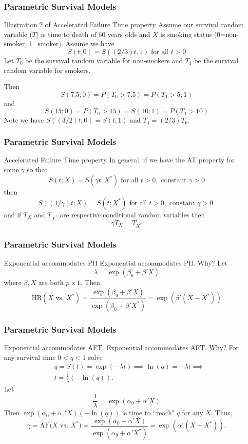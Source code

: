\documentclass{beamer}
\theoremstyle{definition}
\begin{document}
\begin{frame}
\frametitle{Parametric Survival Models}
\begin{block}{Illustration 2 of Accelerated Failure Time property}
Assume our survival random variable ($T$) is time to death of 60 years olds and $X$ is smoking status (0=non-smoker, 1=smoker).
Assume we have
\[
S(t;0) = S((2/3)t,1) \text{ for all } t>0
\]
Let $T_0$ be the survival random variable for non-smokers and $T_1$ be the survival random variable for smokers.

Then
\[ S(7.5;0) = P(T_0>7.5) = P(T_1>5;1) \]
 and
\[S(15;0) = P(T_0>15) = S(10;1) = P(T_1>10)
\]
Note we have $S((3/2)t;0) = S(t;1)$ and $T_1=(2/3)T_0$.
\end{block}
\end{frame}


\begin{frame}
\frametitle{Parametric Survival Models}
\begin{block}{Accelerated Failure Time property}
In general, if we have the AT property for some $\gamma$ so that
\[ S(t;X) =  S(\gamma t;X^*)  \text{ for all } t>0, \text{ constant } \gamma > 0
\]
then
 \[ S((1/\gamma)t;X) =  S( t;X^*)  \text{ for all } t>0, \text{ constant } \gamma > 0.
\]
and if $T_X$ and $T_{X^*}$ are respective conditional random variables then
\[
\gamma T_X = T_{X^*}
\]
\end{block}
\end{frame}

\begin{frame}
\frametitle{Parametric Survival Models}
\begin{block}{Exponential accommodates PH}
Exponential accommodates PH. Why? Let
\[
\lambda=\exp(\beta_0 + \beta' X)
\] where $\beta, X$ are both $p \times 1$.
Then
\[
\text{HR}(X \text{ vs. } X^*)  = \dfrac{\exp(\beta_0 + \beta' X)}{\exp(\beta_0 + \beta' X^*)} = \exp(\beta'(X - X^*))
\]
\end{block}
\end{frame}

\begin{frame}
\frametitle{Parametric Survival Models}
\begin{block}{Exponential accommodates AFT.}
Exponential accommodates AFT. Why? For any survival time $0 < q < 1$ solve
\begin{align*}
& q = S(t) = \exp(- \lambda t) \implies \ln(q) = - \lambda t \implies \\
& t = \frac{1}{\lambda} (- \ln(q)).
\end{align*}
Let
\[
\frac{1}{\lambda} = \exp(\alpha_0 + \alpha'X)
\]
Then $\exp(\alpha_0 + \alpha_1'X)(- \ln(q))$ is time to ``reach" $q$ for any $X$. Thus,
\vspace{-10pt}
\[
\gamma = \text{AF($X$ vs. $X^*$)} = \frac{\exp(\alpha_0 + \alpha'X)}{\exp(\alpha_0 + \alpha'X^*)} = \exp(\alpha'(X-X^*)).
\]
\end{block}
\end{frame}
\end{document}
